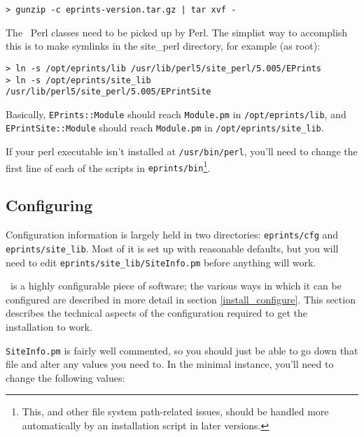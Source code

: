\begin{verbatim}
> gunzip -c eprints-version.tar.gz | tar xvf -
\end{verbatim}

The \eprints\ Perl classes need to be picked up by Perl. The simplist way to accomplish this is to make symlinks in the site\_perl directory, for example (as root):

\begin{verbatim}
> ln -s /opt/eprints/lib /usr/lib/perl5/site_perl/5.005/EPrints
> ln -s /opt/eprints/site_lib
/usr/lib/perl5/site_perl/5.005/EPrintSite
\end{verbatim}

Basically, {\tt EPrints::Module} should reach {\tt Module.pm} in {\tt /opt/eprints/lib}, and {\tt EPrintSite::Module} should reach {\tt Module.pm} in {\tt /opt/eprints/site\_lib}.

If your perl executable isn't installed at {\tt /usr/bin/perl}, you'll need to change the first line of each of the scripts in {\tt eprints/bin}\footnote{This, and other file system path-related issues, should be handled more automatically by an installation script in later versions.}.


\subsection{Configuring \eprints}

Configuration information is largely held in two directories: {\tt eprints/cfg} and {\tt eprints/site\_lib}. Most of it is set up with reasonable defaults, but you will need to edit {\tt eprints/site\_lib/SiteInfo.pm} before anything will work.

\eprints\ is a highly configurable piece of software; the various ways in which it can be configured are described in more detail in section \ref{install_configure}. This section describes the technical aspects of the configuration required to get the installation to work.

{\tt SiteInfo.pm} is fairly well commented, so you should just be able to go down that file and alter any values you need to. In the minimal instance, you'll need to change the following values:

